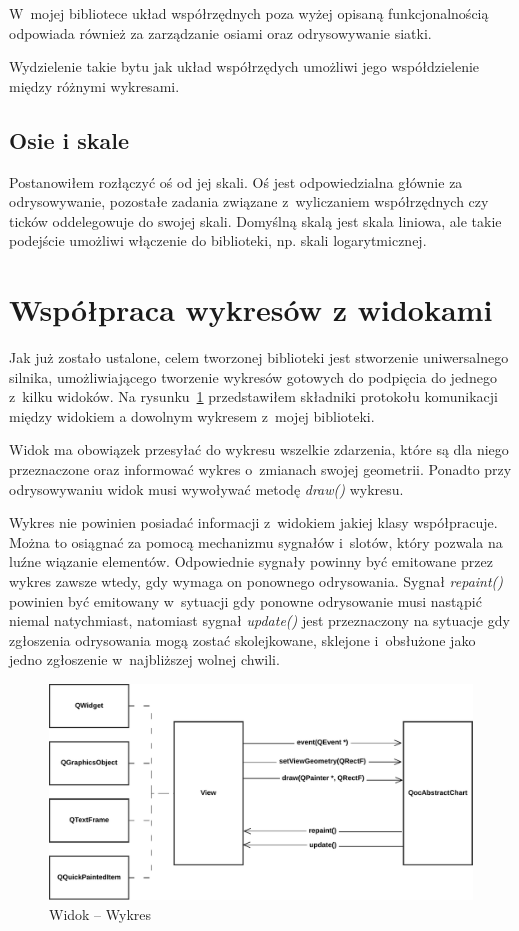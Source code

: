 W~mojej bibliotece układ współrzędnych poza wyżej opisaną funkcjonalnością odpowiada również za zarządzanie osiami oraz odrysowywanie siatki.

Wydzielenie takie bytu jak układ współrzędych umożliwi jego współdzielenie między różnymi wykresami.

\subsection{Osie i skale} 
Postanowiłem rozłączyć oś od jej skali. Oś jest odpowiedzialna głównie za odrysowywanie, pozostałe zadania związane z~wyliczaniem współrzędnych czy ticków oddelegowuje do swojej skali. Domyślną skalą jest skala liniowa, ale takie podejście umożliwi włączenie do biblioteki, np. skali logarytmicznej.


\section{Współpraca wykresów z widokami }
Jak już zostało ustalone, celem tworzonej biblioteki jest stworzenie uniwersalnego silnika, umożliwiającego tworzenie wykresów gotowych do podpięcia do jednego z~kilku widoków. Na rysunku~\ref{rys:widok:wykres} przedstawiłem składniki protokołu komunikacji między widokiem a dowolnym wykresem z~mojej biblioteki.

Widok ma obowiązek przesyłać do wykresu wszelkie zdarzenia, które są dla niego przeznaczone oraz informować wykres o~zmianach swojej geometrii. Ponadto przy odrysowywaniu widok musi wywoływać metodę \textit{draw()} wykresu.

Wykres nie powinien posiadać informacji z~widokiem jakiej klasy współpracuje. Można to osiągnać za pomocą mechanizmu sygnałów i~slotów, który pozwala na luźne wiązanie elementów. Odpowiednie sygnały  powinny być emitowane przez wykres zawsze wtedy, gdy wymaga on ponownego odrysowania.
Sygnał \textit{repaint()} powinien być emitowany w~sytuacji gdy ponowne odrysowanie musi nastąpić niemal natychmiast, natomiast sygnał \textit{update()} jest przeznaczony na sytuacje gdy zgłoszenia odrysowania mogą zostać skolejkowane, sklejone i~obsłużone jako jedno zgłoszenie w~najbliższej wolnej chwili.


\begin{figure}[H]
\centering
\includegraphics[scale=0.75]{img/widok-wykres.pdf}
\caption{Widok -- Wykres}\label{rys:widok:wykres}
\end{figure}

